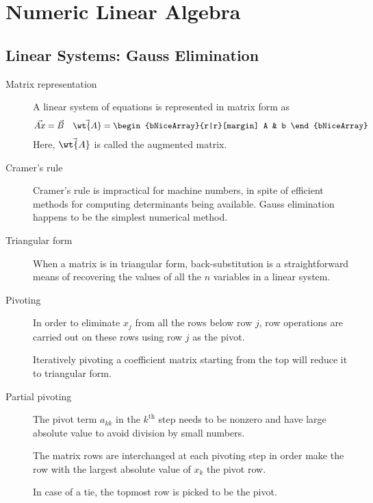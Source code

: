 \chapter{Numeric Linear Algebra}

\section{Linear Systems: Gauss Elimination}

\begin{description}
    \item[Matrix representation] A linear system of equations is represented in matrix
        form as
        \begin{align}
            \vec{Ax} & = \vec{B} & \vec{\wt{A}} & = \begin{bNiceArray}{r|r}[margin]
                                                        A & b
                                                    \end{bNiceArray}
        \end{align}
        Here, $ \vec{\wt{A}} $ is called the augmented matrix.

    \item[Cramer's rule] Cramer's rule is impractical for machine numbers, in spite of
        efficient methods for computing determinants being available. Gauss elimination
        happens to be the simplest numerical method.

    \item[Triangular form] When a matrix is in triangular form, back-substitution is a
        straightforward means of recovering the values of all the $ n $ variables in
        a linear system.

    \item[Pivoting] In order to eliminate $ x_j $ from all the rows below row $ j $,
        row operations are carried out on these rows using row $ j $ as the pivot. \par
        Iteratively pivoting a coefficient matrix starting from the top will reduce it
        to triangular form.

    \item[Partial pivoting] The pivot term $ a_{kk} $ in the $ k^{\text{th}} $
        step needs to be nonzero and have large absolute value to avoid division by small
        numbers. \par
        The matrix rows are interchanged at each pivoting step in order make the row
        with the largest absolute value of $ x_k $ the pivot row. \par
        In case of a tie, the topmost row is picked to be the pivot.


\end{description}
